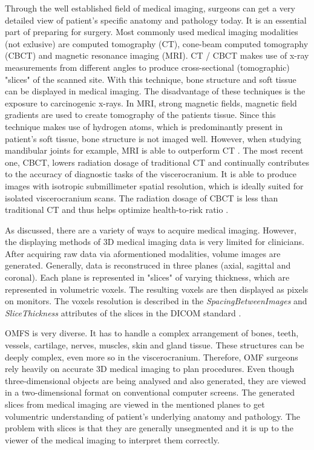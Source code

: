 Through the well established field of medical imaging, surgeons can get a very detailed view of patient’s specific anatomy and pathology today. 
It is an essential part of preparing for surgery.
Most commonly used medical imaging modalities (not exlusive) are computed tomography (CT), cone-beam computed tomography (CBCT) and magnetic resonance imaging (MRI).
CT / CBCT makes use of x-ray measurements from different angles to produce cross-sectional (tomographic) "slices" of the scanned site.
With this technique, bone structure and soft tissue can be displayed in medical imaging.
The disadvantage of these techniques is the exposure to carcinogenic x-rays.
In MRI, strong magnetic fields, magnetic field gradients are used to create tomography of the patients tissue.
Since this technique makes use of hydrogen atoms, which is predominantly present in patient's soft tissue, bone structure is not imaged well.
However, when studying mandibular joints for example, MRI is able to outperform CT \cite{RN65}.
The most recent one, CBCT, lowers radiation dosage of traditional CT and continually contributes to the accuracy of diagnostic tasks of the viscerocranium.
It is able to produce images with isotropic submillimeter spatial resolution, which is ideally suited for isolated viscerocranium scans. 
The radiation dosage of CBCT is less than traditional CT and thus helps optimize health-to-risk ratio \cite{WHITE2008689}.

As discussed, there are a variety of ways to acquire medical imaging.
However, the displaying methods of 3D medical imaging data is very limited for clinicians.
After acquiring raw data via aformentioned modalities, volume images are generated. 
Generally, data is reconstruced in three planes (axial, sagittal and coronal).
Each plane is represented in "slices" of varying thickness, which are represented in volumetric voxels.
The resulting voxels are then displayed as pixels on monitors.
The voxels resolution is described in the \textit{SpacingBetweenImages} and \textit{SliceThickness} attributes of the slices in the DICOM standard \cite{DICOMStandard}.

OMFS is very diverse. It has to handle a complex arrangement of bones, teeth, vessels, cartilage, nerves, muscles, skin and gland tissue.
These structures can be deeply complex, even more so in the viscerocranium.
Therefore, OMF surgeons rely heavily on accurate 3D medical imaging to plan procedures.
Even though three-dimensional objects are being analysed and also generated, they are viewed in a two-dimensional format on conventional computer screens.
The generated slices from medical imaging are viewed in the mentioned planes to get volumentric understanding of patient's underlying anatomy and pathology.
The problem with slices is that they are generally unsegmented and it is up to the viewer of the medical imaging to interpret them correctly.


